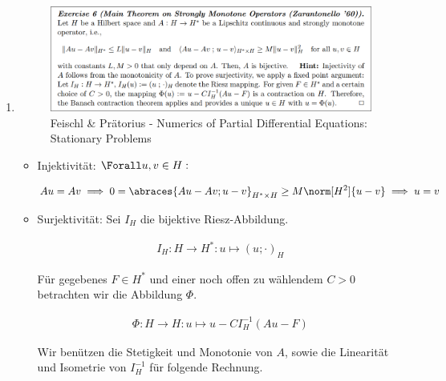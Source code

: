 \begin{solution}

\phantom{}

\begin{enumerate}[label = \textbf{\alph*)}]

  \item \phantom{}

  \begin{figure}[h!]
    \centering
    \includegraphics[width = 0.9 \textwidth]{../../../Fundament-LaTeX/images/NumPDEs/NumPDEs - Exercise 6 (Main Theorem on Strongly Monotone Operatos (Zarantonello '60)).png}
    \caption{Feischl \& Prätorius - Numerics of Partial Differential Equations: Stationary Problems}
  \end{figure}

  \begin{itemize}

    \item Injektivität:
    $\Forall u, v \in H:$

    \begin{align*}
      Au = Av
      \implies
      0 = \abraces{Au - Av; u - v}_{H^\ast \times H} \geq M \norm[H^2]{u -v}
      \implies
      u = v
    \end{align*}

    \item Surjektivität:
    Sei $I_H$ die bijektive Riesz-Abbildung.

    \begin{align*}
      I_H:
      H \to H^\ast:
      u \mapsto (u; \cdot)_H
    \end{align*}

    Für gegebenes $F \in H^\ast$ und einer noch offen zu wählendem $C > 0$ betrachten wir die Abbildung $\Phi$.

    \begin{align*}
      \Phi:
      H \to H:
      u \mapsto u - C I_H^{-1}(Au - F)
    \end{align*}

    Wir benützen die Stetigkeit und Monotonie von $A$, sowie die Linearität und Isometrie von $I_H^{-1}$ für folgende Rechnung.


\end{itemize}
\end{enumerate}
\end{solution}
